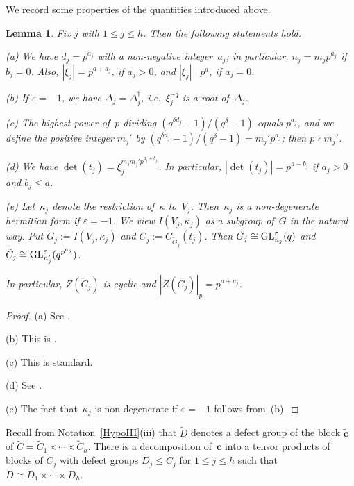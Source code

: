 \documentclass[12pt]{amsart}
\newcommand{\bc}{{\mathbf{c}}}
\def\GL{ \text{\rm GL} }
\newtheorem{lem}[thm]{Lemma}
\theoremstyle{theorem}
\theoremstyle{definition}
\theoremstyle{remark}
\begin{document}
We record some properties of the quantities introduced above.
\begin{lem}
\label{DeterminantLem}
Fix $j$ with $1 \leq j \leq h$. Then the following statements hold.

{\rm (a)} We have $d_j = p^{a_j}$ with a 
non-negative integer~$a_j$; in particular, $n_j = m_j p^{a_j}$ if $b_j = 0$.
Also, $|\xi_j| = p^{a + a_j}$, if $a_j > 0$, and
$|\xi_j| \mid p^a$, if $a_j = 0$. 

{\rm (b)} If $\varepsilon = -1$, we have $\Delta_j = \Delta_j^\dagger$, i.e.\ 
$\xi_j^{-q}$ is a root of~$\Delta_j$. 

{\rm (c)} The highest power of~$p$ dividing 
$(q^{\delta {d_j}} - 1)/(q^{\delta} - 1)$ equals $p^{a_j}$, and we 
define the positive integer $m_j'$ by 
$(q^{\delta {d_j}} - 1)/(q^{\delta} - 1) = m_j'p^{a_j}$; then 
$p \nmid m_j'$. 

{\rm (d)} We have  
$\det(t_j) = \xi_j^{m_jm_j'p^{a_j+b_j}}$.
In particular, $|\det(t_j)| = p^{a-b_j}$ if $a_j > 0$ and $b_j \leq a$.

{\rm (e)} Let~$\kappa_j$ denote the restriction of~$\kappa$ to~$V_j$. Then~$\kappa_j$ 
is a non-degenerate hermitian form if $\varepsilon = -1$. We view 
$I(V_j,\kappa_j)$ as a subgroup of~$\tilde{G}$ in the natural way. Put 
$\tilde{G}_j := {I(V_j,\kappa_j)}$ and 
$\tilde{C}_{j} := C_{\tilde{G}_j}( t_j )$. Then 
$\tilde{G}_j \cong \GL^\varepsilon_{n_j}( q )$ and 
$\tilde{C}_{j} \cong \GL^\varepsilon_{n_j'}( q^{p^{a_j}} )$. 

In particular,
$Z( \tilde{C}_{j} )$ is cyclic and $|Z( \tilde{C}_{j} )|_p = p^{a+a_j}$.
\end{lem}
\begin{proof}
(a) See \cite[Lemma~$4.1.1$(c)]{HL25}.

(b) This is \cite[Lemma~$3.2.2$]{HL25}.

(c) This is standard.

(d) See \cite[Lemma~$4.1.1$(e)]{HL25}.

(e) The fact that~$\kappa_j$ is non-degenerate if $\varepsilon = -1$ follows
from~(b).
\end{proof}
Recall from Notation~\ref{HypoIII}(iii) that $\tilde{D}$ denotes a defect group 
of the block $\tilde{\bc}$ of
$\tilde{C} = \tilde{C}_1 \times \cdots \times \tilde{C}_h$. There is a 
decomposition of~$\bc$ into a tensor products of blocks of $\tilde{C}_j$ with
defect groups $\tilde{D}_j \leq \tilde{C}_j$ for $1 \leq j \leq h$ such that 
$\tilde{D} \cong \tilde{D}_1 \times \cdots \times \tilde{D}_h$.
\end{document}
